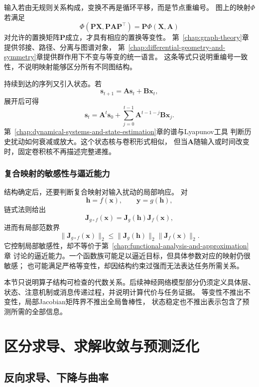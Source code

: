 输入若由无规则关系构成，变换不再是循环平移，而是节点重编号。
图上的映射$\Phi$若满足
\[
  \Phi(\bm{P}\bm{X},\bm{P}\bm{A}\bm{P}^{\top})
  =
  \bm{P}\Phi(\bm{X},\bm{A})
\]
对允许的置换矩阵$\bm{P}$成立，才具有相应的置换等变性。
第~\ref{chap:graph-theory}章提供邻接、路径、分离与图谱对象，
第~\ref{chap:differential-geometry-and-symmetry}章提供群作用下不变与等变的统一语言。
这条等式只说明重编号一致性，不说明映射能够区分所有不同图结构。

持续到达的序列又引入状态。若
\[
  \bm{s}_{t+1}
  =
  \bm{A}\bm{s}_t+\bm{B}\bm{x}_t,
\]
展开后可得
\[
  \bm{s}_{t}
  =
  \bm{A}^{t}\bm{s}_0
  +
  \sum_{j=0}^{t-1}
  \bm{A}^{t-1-j}\bm{B}\bm{x}_j.
\]
第~\ref{chap:dynamical-systems-and-state-estimation}章的谱与Lyapunov工具
判断历史扰动如何衰减或放大。这个状态核与卷积形式相似，
但当$\bm{A}$随输入或时间改变时，固定卷积核不再描述完整递推。

\subsubsection{复合映射的敏感性与逼近能力}
\label{sec:future-composition-sensitivity-approximation}

结构确定后，还要判断复合映射对输入扰动的局部响应。
对
\[
  \bm{h}=f(\bm{x}),
  \qquad
  \bm{y}=g(\bm{h}),
\]
链式法则给出
\[
  \bm{J}_{g\circ f}(\bm{x})
  =
  \bm{J}_{g}(\bm{h})\bm{J}_{f}(\bm{x}),
\]
进而有局部范数界
\[
  \lVert\bm{J}_{g\circ f}(\bm{x})\rVert_2
  \leq
  \lVert\bm{J}_{g}(\bm{h})\rVert_2
  \lVert\bm{J}_{f}(\bm{x})\rVert_2.
\]
它控制局部敏感性，却不等价于第~\ref{chap:functional-analysis-and-approximation}章
讨论的逼近能力。一个函数族可能足以逼近目标，但具体参数对应的映射仍很敏感；
也可能满足严格等变性，却因结构约束过强而无法表达任务所需关系。

本节只说明算子结构可检查的代数关系。后续神经网络模型部分仍须定义具体层、
状态、注意机制或消息传递过程，并说明计算代价与任务证据。
等变性不推出不变性，局部Jacobian矩阵界不推出全局鲁棒性，
状态稳定也不推出表示包含了预测所需的全部信息。

\section{区分求导、求解收敛与预测泛化}
\label{sec:future-neural-training-generalization}

\subsection{反向求导、下降与曲率}
\label{sec:future-backpropagation-descent-curvature}

